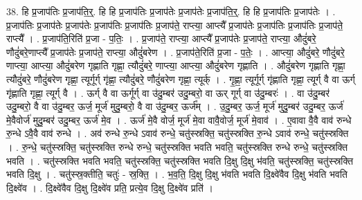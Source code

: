 \documentclass[17pt]{extarticle}
\begin{document}
38. हि प्र॒जाप॑तिः प्र॒जाप॑ति॒र्॒. हि हि प्र॒जाप॑तिः प्र॒जाप॑तेः प्र॒जाप॑तेः प्र॒जाप॑ति॒र्॒. हि हि प्र॒जाप॑तिः प्र॒जाप॑तेः । . प्र॒जाप॑तिः प्र॒जाप॑तेः प्र॒जाप॑तेः प्र॒जाप॑तिः प्र॒जाप॑तिः प्र॒जाप॑ते॒ राप्त्या॒ आप्त्यै᳚ प्र॒जाप॑तेः प्र॒जाप॑तिः प्र॒जाप॑तिः प्र॒जाप॑ते॒ राप्त्यै᳚ । . प्र॒जाप॑ति॒रिति॑ प्र॒जा - प॒तिः॒ । . प्र॒जाप॑ते॒ राप्त्या॒ आप्त्यै᳚ प्र॒जाप॑तेः प्र॒जाप॑ते॒ राप्त्या॒ औदुं॑बरे॒ णौदुं॑बरे॒णाप्त्यै᳚ प्र॒जाप॑तेः प्र॒जाप॑ते॒ राप्त्या॒ औदुं॑बरेण । . प्र॒जाप॑ते॒रिति॑ प्र॒जा - प॒तेः॒ । . आप्त्या॒ औदुं॑बरे॒ णौदुं॑बरे॒ णाप्त्या॒ आप्त्या॒ औदुं॑बरेण गृह्णाति गृह्णा॒ त्यौदुं॑बरे॒ णाप्त्या॒ आप्त्या॒ औदुं॑बरेण गृह्णाति । . औदुं॑बरेण गृह्णाति गृह्णा॒ त्यौदुं॑बरे॒ णौदुं॑बरेण गृह्णा॒ त्यूर्गूर्ग् गृ॑ह्णा॒ त्यौदुं॑बरे॒
णौदुं॑बरेण गृह्णा॒ त्यूर्क् । . गृ॒ह्णा॒ त्यूर्गूर्ग् गृ॑ह्णाति गृह्णा॒ त्यूर्ग् वै वा ऊर्ग् गृ॑ह्णाति गृह्णा॒ त्यूर्ग् वै । . ऊर्ग् वै वा ऊर्गूर्ग् वा उ॑दु॒म्बर॑ उदु॒म्बरो॒ वा ऊर् गूर्ग् वा उ॑दु॒म्बरः॑ । . वा उ॑दु॒म्बर॑ उदु॒म्बरो॒ वै वा उ॑दु॒म्बर॒ ऊर्ज॒ मूर्ज॑ मुदु॒म्बरो॒ वै वा उ॑दु॒म्बर॒ ऊर्ज᳚म् । . उ॒दु॒म्बर॒ ऊर्ज॒ मूर्ज॑ मुदु॒म्बर॑ उदु॒म्बर॒ ऊर्ज॑ मे॒वैवोर्ज॑ मुदु॒म्बर॑ उदु॒म्बर॒ ऊर्ज॑ मे॒व । . ऊर्ज॑ मे॒वै वोर्ज॒ मूर्ज॑ मे॒वा वावै॒वोर्ज॒ मूर्ज॑ मे॒वाव॑ । . ए॒वावा वै॒वै वाव॑ रुन्धे रु॒न्धे ऽवै॒वै वाव॑ रुन्धे । . अव॑ रुन्धे रु॒न्धे ऽवाव॑ रुन्धे॒ चतु॑स्स्रक्ति॒ चतु॑स्स्रक्ति रु॒न्धे ऽवाव॑ रुन्धे॒ चतु॑स्स्रक्ति । . रु॒न्धे॒ चतु॑स्स्रक्ति॒ चतु॑स्स्रक्ति रुन्धे रुन्धे॒ चतु॑स्स्रक्ति भवति भवति॒ चतु॑स्स्रक्ति रुन्धे रुन्धे॒ चतु॑स्स्रक्ति भवति । . चतु॑स्स्रक्ति भवति भवति॒ चतु॑स्स्रक्ति॒ चतु॑स्स्रक्ति भवति दि॒क्षु दि॒क्षु भ॑वति॒ चतु॑स्स्रक्ति॒ चतु॑स्स्रक्ति भवति दि॒क्षु । . चतु॑स्स्र॒क्तीति॒ चतुः॑ - स्र॒क्ति॒ । . भ॒व॒ति॒ दि॒क्षु दि॒क्षु भ॑वति भवति दि॒क्ष्वे॑वैव दि॒क्षु भ॑वति भवति दि॒क्ष्वे॑व । . दि॒क्ष्वे॑वैव दि॒क्षु दि॒क्ष्वे॑व प्रति॒ प्रत्ये॒व दि॒क्षु दि॒क्ष्वे॑व प्रति॑ । \newline
\pagebreak
{}
\end{document}
